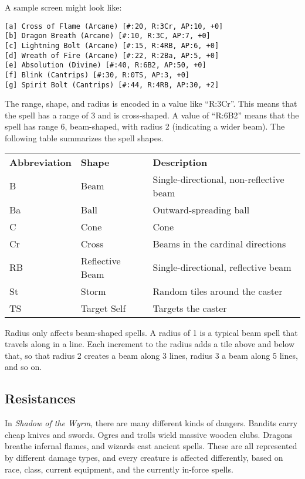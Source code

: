 A sample screen might look like:

\begin{verbatim}
[a] Cross of Flame (Arcane) [#:20, R:3Cr, AP:10, +0]
[b] Dragon Breath (Arcane) [#:10, R:3C, AP:7, +0]
[c] Lightning Bolt (Arcane) [#:15, R:4RB, AP:6, +0]
[d] Wreath of Fire (Arcane) [#:22, R:2Ba, AP:5, +0]
[e] Absolution (Divine) [#:40, R:6B2, AP:50, +0]
[f] Blink (Cantrips) [#:30, R:0TS, AP:3, +0]
[g] Spirit Bolt (Cantrips) [#:44, R:4RB, AP:30, +2]
\end{verbatim}

The range, shape, and radius is encoded in a value like ``R:3Cr''.  This
means that the spell has a range of 3 and is cross-shaped.  A value of
``R:6B2'' means that the spell has range 6, beam-shaped, with radius 2
(indicating a wider beam).  The following table summarizes the spell
shapes.

\begin{table}[h]
\begin{tabular}{lll}
{\bf Abbreviation} & {\bf Shape} & {\bf Description} \\
B & Beam & Single-directional, non-reflective beam \\
Ba & Ball & Outward-spreading ball \\
C & Cone & Cone \\
Cr & Cross & Beams in the cardinal directions \\
RB & Reflective Beam & Single-directional, reflective beam \\
St & Storm & Random tiles around the caster \\
TS & Target Self & Targets the caster \\
\end{tabular}
\end{table}

Radius only affects beam-shaped spells.  A radius of 1 is a typical
beam spell that travels along in a line.  Each increment to the radius
adds a tile above and below that, so that radius 2 creates a beam along
3 lines, radius 3 a beam along 5 lines, and so on.

\subsection{Resistances}

In {\it Shadow of the Wyrm}, there are many different kinds of dangers.  
Bandits carry cheap knives and swords.  Ogres and trolls wield massive
wooden clubs.  Dragons breathe infernal flames, and wizards cast ancient 
spells.  These are all represented by different damage types, and every 
creature is affected differently, based on race, class, current equipment, 
and the currently in-force spells.

